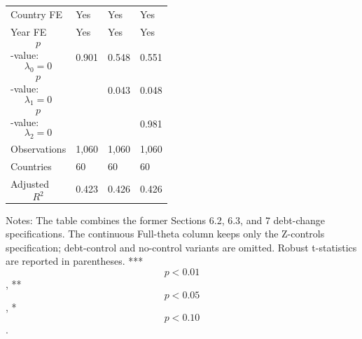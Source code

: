 \begin{table}[H]
\begin{threeparttable}
\begin{tabularx}{\textwidth}{lYYY}
Country FE & Yes & Yes & Yes \\
Year FE & Yes & Yes & Yes \\
$$p$$-value: $$\lambda_0=0$$ & 0.901 & 0.548 & 0.551 \\
$$p$$-value: $$\lambda_1=0$$ &  & 0.043 & 0.048 \\
$$p$$-value: $$\lambda_2=0$$ &  &  & 0.981 \\
Observations & 1,060 & 1,060 & 1,060 \\
Countries & 60 & 60 & 60 \\
Adjusted $$R^2$$ & 0.423 & 0.426 & 0.426 \\
\bottomrule
\end{tabularx}
\begin{tablenotes}[flushleft]\footnotesize
\item Notes: The table combines the former Sections 6.2, 6.3, and 7 debt-change specifications. The continuous Full-theta column keeps only the Z-controls specification; debt-control and no-control variants are omitted. Robust t-statistics are reported in parentheses. *** $$p<0.01$$, ** $$p<0.05$$, * $$p<0.10$$.
\end{tablenotes}
\end{threeparttable}
\end{table}
